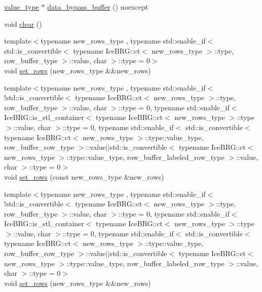 \begin{DoxyCompactItemize}
\hyperlink{classIceBRG_1_1labeled__array_a183002e8991647a6fbed8c13b64ff8f4}{value\+\_\+type} $\ast$ \hyperlink{classIceBRG_1_1labeled__array_a91ad0a7662f07dcc3691e9cb26dcc67b}{data\+\_\+bypass\+\_\+buffer} () noexcept
\item 
void \hyperlink{classIceBRG_1_1labeled__array_aa7bce0100b872f2c20c337a5ead22624}{clear} ()
\item 
{\footnotesize template$<$typename new\+\_\+rows\+\_\+type , typename std\+::enable\+\_\+if$<$ std\+::is\+\_\+convertible$<$ typename Ice\+B\+R\+G\+::ct$<$ new\+\_\+rows\+\_\+type $>$\+::type, row\+\_\+buffer\+\_\+type $>$\+::value, char $>$\+::type  = 0$>$ }\\void \hyperlink{classIceBRG_1_1labeled__array_a33762d54abb65698c22b82f0692f054f}{set\+\_\+rows} (new\+\_\+rows\+\_\+type \&\&new\+\_\+rows)
\item 
{\footnotesize template$<$typename new\+\_\+rows\+\_\+type , typename std\+::enable\+\_\+if$<$!std\+::is\+\_\+convertible$<$ typename Ice\+B\+R\+G\+::ct$<$ new\+\_\+rows\+\_\+type $>$\+::type, row\+\_\+buffer\+\_\+type $>$\+::value, char $>$\+::type  = 0, typename std\+::enable\+\_\+if$<$ Ice\+B\+R\+G\+::is\+\_\+stl\+\_\+container$<$ typename Ice\+B\+R\+G\+::ct$<$ new\+\_\+rows\+\_\+type $>$\+::type $>$\+::value, char $>$\+::type  = 0, typename std\+::enable\+\_\+if$<$ std\+::is\+\_\+convertible$<$ typename Ice\+B\+R\+G\+::ct$<$ new\+\_\+rows\+\_\+type $>$\+::type\+::value\+\_\+type, row\+\_\+buffer\+\_\+row\+\_\+type $>$\+::value$\vert$$\vert$std\+::is\+\_\+convertible$<$ typename Ice\+B\+R\+G\+::ct$<$ new\+\_\+rows\+\_\+type $>$\+::type\+::value\+\_\+type, row\+\_\+buffer\+\_\+labeled\+\_\+row\+\_\+type $>$\+::value, char $>$\+::type  = 0$>$ }\\void \hyperlink{classIceBRG_1_1labeled__array_a2cff1411f54ff24f36d8497c9f543475}{set\+\_\+rows} (const new\+\_\+rows\+\_\+type \&new\+\_\+rows)
\item 
{\footnotesize template$<$typename new\+\_\+rows\+\_\+type , typename std\+::enable\+\_\+if$<$!std\+::is\+\_\+convertible$<$ typename Ice\+B\+R\+G\+::ct$<$ new\+\_\+rows\+\_\+type $>$\+::type, row\+\_\+buffer\+\_\+type $>$\+::value, char $>$\+::type  = 0, typename std\+::enable\+\_\+if$<$ Ice\+B\+R\+G\+::is\+\_\+stl\+\_\+container$<$ typename Ice\+B\+R\+G\+::ct$<$ new\+\_\+rows\+\_\+type $>$\+::type $>$\+::value, char $>$\+::type  = 0, typename std\+::enable\+\_\+if$<$ std\+::is\+\_\+convertible$<$ typename Ice\+B\+R\+G\+::ct$<$ new\+\_\+rows\+\_\+type $>$\+::type\+::value\+\_\+type, row\+\_\+buffer\+\_\+row\+\_\+type $>$\+::value$\vert$$\vert$std\+::is\+\_\+convertible$<$ typename Ice\+B\+R\+G\+::ct$<$ new\+\_\+rows\+\_\+type $>$\+::type\+::value\+\_\+type, row\+\_\+buffer\+\_\+labeled\+\_\+row\+\_\+type $>$\+::value, char $>$\+::type  = 0$>$ }\\void \hyperlink{classIceBRG_1_1labeled__array_ad7c325e9d85b4508d5b782e80b3d9cba}{set\+\_\+rows} (new\+\_\+rows\+\_\+type \&\&new\+\_\+rows)

\end{DoxyCompactItemize}
